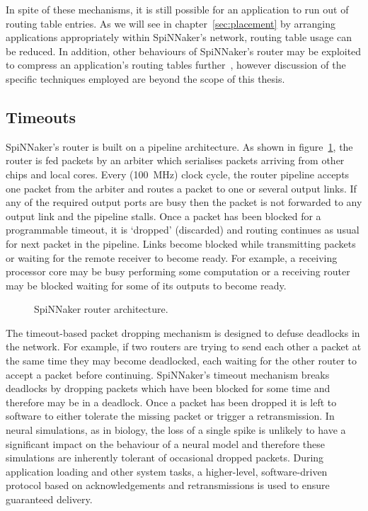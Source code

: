 			In spite of these mechanisms, it is still possible for an application to
			run out of routing table entries. As we will see in
			chapter~\ref{sec:placement} by arranging applications appropriately
			within SpiNNaker's network, routing table usage can be reduced. In
			addition, other behaviours of SpiNNaker's router may be exploited to
			compress an application's routing tables further~\cite{mundy16}, however
			discussion of the specific techniques employed are beyond the scope of
			this thesis.
		
		\subsection{Timeouts}
			
			SpiNNaker's router is built on a pipeline architecture. As shown in
			figure~\ref{fig:router-architecture}, the router is fed packets by an
			arbiter which serialises packets arriving from other chips and local
			cores. Every (\SI{100}{\mega\hertz}) clock cycle, the router pipeline
			accepts one packet from the arbiter and routes a packet to one or several
			output links. If any of the required output ports are busy then the
			packet is not forwarded to any output link and the pipeline stalls. Once
			a packet has been blocked for a programmable timeout, it is `dropped'
			(discarded) and routing continues as usual for next packet in the
			pipeline. Links become blocked while transmitting packets or waiting for
			the remote receiver to become ready. For example, a receiving processor
			core may be busy performing some computation or a receiving router may be
			blocked waiting for some of its outputs to become ready.
			
			\begin{figure}
				\center
				
				\caption{SpiNNaker router architecture.}
				\label{fig:router-architecture}
			\end{figure}
			
			The timeout-based packet dropping mechanism is designed to defuse
			deadlocks in the network. For example, if two routers are trying to send
			each other a packet at the same time they may become deadlocked, each
			waiting for the other router to accept a packet before continuing.
			SpiNNaker's timeout mechanism breaks deadlocks by dropping packets which
			have been blocked for some time and therefore may be in a deadlock.  Once
			a packet has been dropped it is left to software to either tolerate the
			missing packet or trigger a retransmission. In neural simulations, as in
			biology, the loss of a single spike is unlikely to have a significant
			impact on the behaviour of a neural model and therefore these simulations
			are inherently tolerant of occasional dropped packets. During application
			loading and other system tasks, a higher-level, software-driven protocol
			based on acknowledgements and retransmissions is used to ensure
			guaranteed delivery.
			
